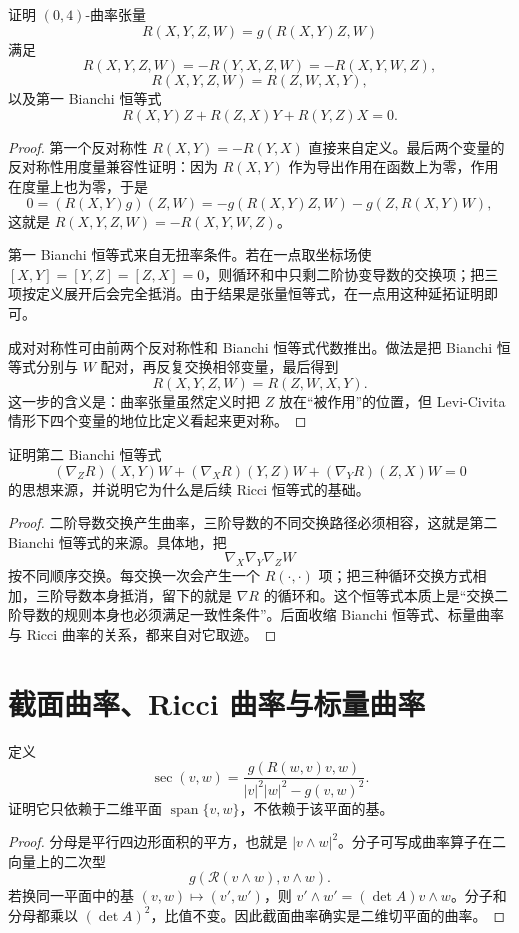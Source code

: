 \documentclass[11pt,a4paper,openany]{ctexbook}
\numberwithin{equation}{chapter}
\begin{document}
\begin{problem}
证明 \((0,4)\)-曲率张量
\[
R(X,Y,Z,W)=g(R(X,Y)Z,W)
\]
满足
\[
R(X,Y,Z,W)=-R(Y,X,Z,W)=-R(X,Y,W,Z),
\]
\[
R(X,Y,Z,W)=R(Z,W,X,Y),
\]
以及第一 Bianchi 恒等式
\[
R(X,Y)Z+R(Z,X)Y+R(Y,Z)X=0.
\]
\end{problem}
\begin{proof}
第一个反对称性 \(R(X,Y)=-R(Y,X)\) 直接来自定义。最后两个变量的反对称性用度量兼容性证明：因为 \(R(X,Y)\) 作为导出作用在函数上为零，作用在度量上也为零，于是
\[
0=(R(X,Y)g)(Z,W)=-g(R(X,Y)Z,W)-g(Z,R(X,Y)W),
\]
这就是 \(R(X,Y,Z,W)=-R(X,Y,W,Z)\)。

第一 Bianchi 恒等式来自无扭率条件。若在一点取坐标场使 \([X,Y]=[Y,Z]=[Z,X]=0\)，则循环和中只剩二阶协变导数的交换项；把三项按定义展开后会完全抵消。由于结果是张量恒等式，在一点用这种延拓证明即可。

成对对称性可由前两个反对称性和 Bianchi 恒等式代数推出。做法是把 Bianchi 恒等式分别与 \(W\) 配对，再反复交换相邻变量，最后得到
\[
R(X,Y,Z,W)=R(Z,W,X,Y).
\]
这一步的含义是：曲率张量虽然定义时把 \(Z\) 放在“被作用”的位置，但 Levi-Civita 情形下四个变量的地位比定义看起来更对称。
\end{proof}

\begin{problem}
证明第二 Bianchi 恒等式
\[
(\nabla_ZR)(X,Y)W+(\nabla_XR)(Y,Z)W+(\nabla_YR)(Z,X)W=0
\]
的思想来源，并说明它为什么是后续 Ricci 恒等式的基础。
\end{problem}
\begin{proof}
二阶导数交换产生曲率，三阶导数的不同交换路径必须相容，这就是第二 Bianchi 恒等式的来源。具体地，把
\[
\nabla_X\nabla_Y\nabla_ZW
\]
按不同顺序交换。每交换一次会产生一个 \(R(\cdot,\cdot)\) 项；把三种循环交换方式相加，三阶导数本身抵消，留下的就是 \(\nabla R\) 的循环和。这个恒等式本质上是“交换二阶导数的规则本身也必须满足一致性条件”。后面收缩 Bianchi 恒等式、标量曲率与 Ricci 曲率的关系，都来自对它取迹。
\end{proof}

\section{截面曲率、Ricci 曲率与标量曲率}

\begin{problem}
定义
\[
\operatorname{sec}(v,w)=
\frac{g(R(w,v)v,w)}{|v|^2|w|^2-g(v,w)^2}.
\]
证明它只依赖于二维平面 \(\operatorname{span}\{v,w\}\)，不依赖于该平面的基。
\end{problem}
\begin{proof}
分母是平行四边形面积的平方，也就是 \(|v\wedge w|^2\)。分子可写成曲率算子在二向量上的二次型
\[
g(\mathcal R(v\wedge w),v\wedge w).
\]
若换同一平面中的基 \((v,w)\mapsto (v',w')\)，则 \(v'\wedge w'=(\det A)v\wedge w\)。分子和分母都乘以 \((\det A)^2\)，比值不变。因此截面曲率确实是二维切平面的曲率。
\end{proof}
\end{document}

